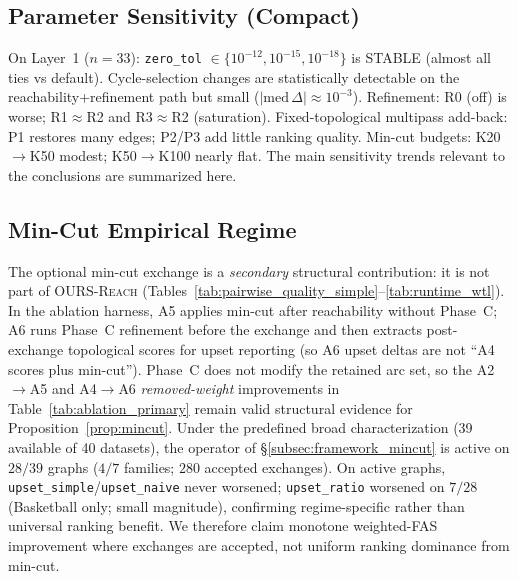 \documentclass{article}
\begin{document}
\subsection{Parameter Sensitivity (Compact)}
\label{subsec:sensitivity}

On Layer~1 ($n=33$): \texttt{zero\_tol} $\in\{10^{-12},10^{-15},10^{-18}\}$ is STABLE (almost all ties vs default).
Cycle-selection changes are statistically detectable on the reachability+refinement path but small ($|\mathrm{med}\,\Delta|\approx 10^{-3}$).
Refinement: R0 (off) is worse; R1$\approx$R2 and R3$\approx$R2 (saturation).
Fixed-topological multipass add-back: P1 restores many edges; P2/P3 add little ranking quality.
Min-cut budgets: K20$\to$K50 modest; K50$\to$K100 nearly flat. The main sensitivity trends relevant to the conclusions are summarized here.

\subsection{Min-Cut Empirical Regime}
\label{subsec:mincut_emp}
The optional min-cut exchange is a \emph{secondary} structural contribution: it is not part of \textsc{OURS-Reach} (Tables~\ref{tab:pairwise_quality_simple}--\ref{tab:runtime_wtl}).
In the ablation harness, A5 applies min-cut after reachability without Phase~C; A6 runs Phase~C refinement before the exchange and then extracts post-exchange topological scores for upset reporting (so A6 upset deltas are not ``A4 scores plus min-cut'').
Phase~C does not modify the retained arc set, so the A2$\to$A5 and A4$\to$A6 \emph{removed-weight} improvements in Table~\ref{tab:ablation_primary} remain valid structural evidence for Proposition~\ref{prop:mincut}.
Under the predefined broad characterization (39 available of 40 datasets), the operator of \S\ref{subsec:framework_mincut} is active on $28/39$ graphs ($4/7$ families; $280$ accepted exchanges).
On active graphs, \texttt{upset\_simple}/\texttt{upset\_naive} never worsened; \texttt{upset\_ratio} worsened on $7/28$ (Basketball only; small magnitude), confirming regime-specific rather than universal ranking benefit.
We therefore claim monotone weighted-FAS improvement where exchanges are accepted, not uniform ranking dominance from min-cut.
\end{document}
